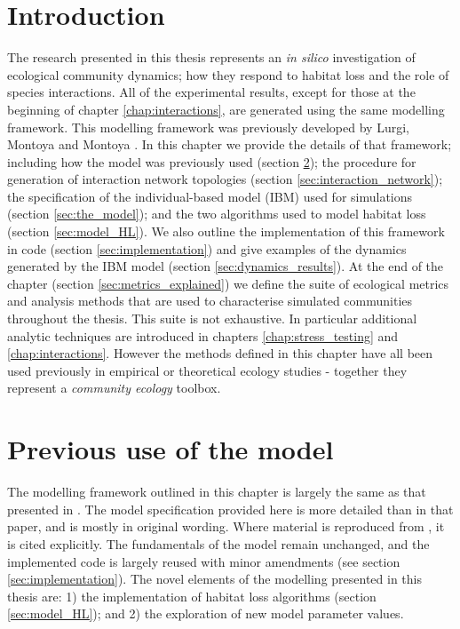 

\section{Introduction}
\label{sec:methods_intro}
The research presented in this thesis represents an \emph{in silico} investigation of ecological community dynamics; how they respond to habitat loss and the role of species interactions. All of the experimental results, except for those at the beginning of chapter \ref{chap:interactions}, are generated using the same modelling framework. This modelling framework was previously developed by Lurgi, Montoya and Montoya \cite{lurgi2015effects}. In this chapter we provide the details of that framework; including how the model was previously used (section \ref{sec:lurgi_prev}); the procedure for generation of interaction network topologies (section \ref{sec:interaction_network}); the specification of the individual-based model (IBM) used for simulations (section \ref{sec:the_model}); and the two algorithms used to model habitat loss (section \ref{sec:model_HL}). We also outline the implementation of this framework in code (section \ref{sec:implementation}) and give examples of the dynamics generated by the IBM model (section \ref{sec:dynamics_results}). At the end of the chapter (section \ref{sec:metrics_explained}) we define the suite of ecological metrics and analysis methods that are used to characterise simulated communities throughout the thesis. This suite is not exhaustive. In particular additional analytic techniques are introduced in chapters \ref{chap:stress_testing} and \ref{chap:interactions}. However the methods defined in this chapter have all been used previously in empirical or theoretical ecology studies - together they represent a \emph{community ecology} toolbox. 

\section{Previous use of the model}
\label{sec:lurgi_prev}

The modelling framework outlined in this chapter is largely the same as that presented in \cite{lurgi2015effects}. The model specification provided here is more detailed than in that paper, and is mostly in original wording. Where material is reproduced from \cite{lurgi2015effects}, it is cited explicitly. The fundamentals of the model remain unchanged, and the implemented code is largely reused with minor amendments (see section \ref{sec:implementation}). The novel elements of the modelling presented in this thesis are: 1) the implementation of habitat loss algorithms (section \ref{sec:model_HL}); and 2) the exploration of new model parameter values.

